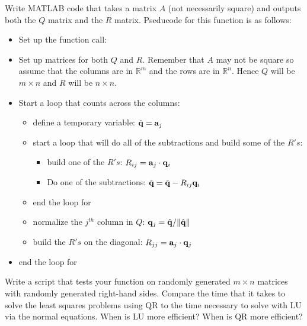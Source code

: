 \begin{problem}
    Write MATLAB code that takes a matrix $A$ (not necessarily square) and outputs 
    both the $Q$ matrix and the $R$ matrix. Pseducode for this function is as follows:
    \begin{itemize}
        \item Set up the function call:\\ 
        \item Set up  matrices for both $Q$ and $R$.  Remember that $A$ may
            not be square so assume that the columns are in $\mathbb{R}^m$ and the rows
            are in $\mathbb{R}^n$.  Hence $Q$ will be $m \times n$ and $R$ will be $n
            \times n$.
        \item Start a loop that counts across the columns:\\ 
            \begin{itemize}
                \item define a temporary variable: $\hat{{\bf q}} = {\bf a}_j$
                \item start a loop that will do all of the subtractions and build some of
                    the $R's$:\\ 
                    \begin{itemize}
                        \item build one of the $R's$: $R_{ij} = {\bf a}_j \cdot {\bf q}_i$
                        \item Do one of the subtractions: $\hat{{\bf q}} = \hat{{\bf q}} - R_{ij} {\bf q}_i$
                    \end{itemize}
                \item end the loop for 
                \item normalize the $j^{th}$ column in $Q$: ${\bf q}_j = \hat{{\bf q}} / \| \hat{{\bf q}} \|$
                \item build the $R's$ on the diagonal: $R_{jj} = {\bf a}_j \cdot {\bf q}_j$
            \end{itemize}
        \item end the loop for 
    \end{itemize}
\end{problem}

\begin{problem}
    Write a script that tests your  function on randomly generated $m\times n$ matrices
    with randomly generated right-hand sides. Compare the time that it takes to solve the
    least squares problems using QR to the time necessary to solve with LU via the normal
    equations. When is LU more efficient? When is QR more efficient?
\end{problem}


